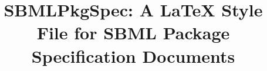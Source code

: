 \documentclass{bmcart}
\newcommand{\sbmlpkg}{SBMLPkgSpec}
\begin{document}
\begin{frontmatter}

\begin{fmbox}


\title{\sbmlpkg: A LaTeX Style File for SBML Package Specification Documents}


\author[
   addressref={aff1},                   %
   corref={aff1},                       %
   email={mhucka@caltech.edu}   %
]{ }


\address[id=aff1]{%
  , %
  ,
  ,
}



\end{fmbox}
\end{frontmatter}
\end{document}
